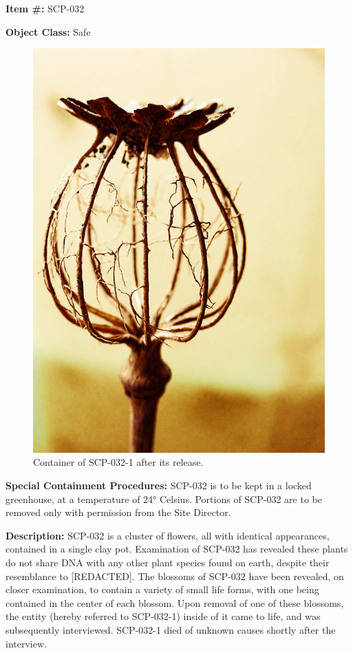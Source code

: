 
\textbf{Item \#:} SCP-032

\textbf{Object Class:} Safe

\begin{figure}[h]
\begin{center}
\includegraphics[scale=0.35]{scp/032.jpg}
\linebreak Container of SCP-032-1 after its release.
\end{center}
\end{figure}

\textbf{Special Containment Procedures:} SCP-032 is to be kept in a locked greenhouse, at a temperature of 24° Celsius. Portions of SCP-032 are to be removed only with permission from the Site Director.

\textbf{Description:} SCP-032 is a cluster of flowers, all with identical appearances, contained in a single clay pot. Examination of SCP-032 has revealed these plants do not share DNA with any other plant species found on earth, despite their resemblance to [REDACTED]. The blossoms of SCP-032 have been revealed, on closer examination, to contain a variety of small life forms, with one being contained in the center of each blossom. Upon removal of one of these blossoms, the entity (hereby referred to SCP-032-1) inside of it came to life, and was subsequently interviewed. SCP-032-1 died of unknown causes shortly after the interview.

